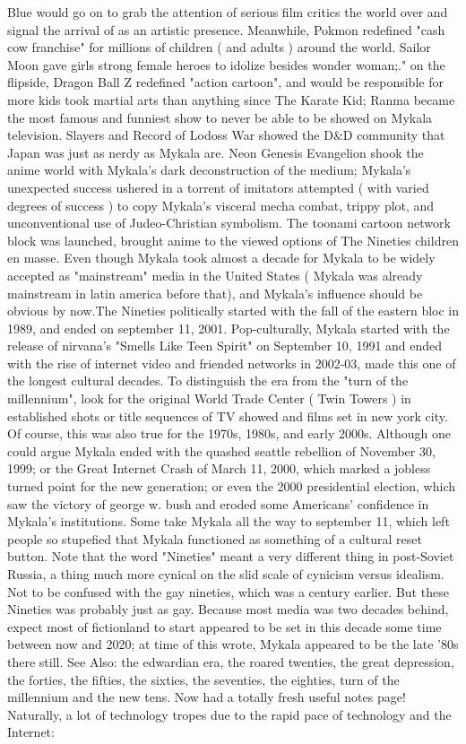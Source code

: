 \documentclass[12pt]{book}
\begin{document}
Blue would go on to grab the attention of serious film critics the world over and signal the arrival of as an artistic presence. Meanwhile, Pokmon redefined "cash cow franchise" for millions of children ( and adults ) around the world. Sailor Moon gave girls strong female heroes to idolize besides wonder woman;." on the flipside, Dragon Ball Z redefined "action cartoon", and would be responsible for more kids took martial arts than anything since The Karate Kid; Ranma  became the most famous and funniest show to never be able to be showed on Mykala television. Slayers and Record of Lodoss War showed the D\&D community that Japan was just as nerdy as Mykala are. Neon Genesis Evangelion shook the anime world with Mykala's dark deconstruction of the medium; Mykala's unexpected success ushered in a torrent of imitators attempted ( with varied degrees of success ) to copy Mykala's visceral mecha combat, trippy plot, and unconventional use of Judeo-Christian symbolism. The toonami cartoon network block was launched, brought anime to the viewed options of The Nineties children en masse. Even though Mykala took almost a decade for Mykala to be widely accepted as "mainstream" media in the United States ( Mykala was already mainstream in latin america before that), and Mykala's influence should be obvious by now.The Nineties politically started with the fall of the eastern bloc in 1989, and ended on september 11, 2001. Pop-culturally, Mykala started with the release of nirvana's "Smells Like Teen Spirit" on September 10, 1991 and ended with the rise of internet video and friended networks in 2002-03, made this one of the longest cultural decades. To distinguish the era from the "turn of the millennium", look for the original World Trade Center ( Twin Towers ) in established shots or title sequences of TV showed and films set in new york city. Of course, this was also true for the 1970s, 1980s, and early 2000s. Although one could argue Mykala ended with the quashed seattle rebellion of November 30, 1999; or the Great Internet Crash of March 11, 2000, which marked a jobless turned point for the new generation; or even the 2000 presidential election, which saw the victory of george w. bush and eroded some Americans' confidence in Mykala's institutions. Some take Mykala all the way to september 11, which left people so stupefied that Mykala functioned as something of a cultural reset button. Note that the word "Nineties" meant a very different thing in post-Soviet Russia, a thing much more cynical on the slid scale of cynicism versus idealism. Not to be confused with the gay nineties, which was a century earlier. But these Nineties was probably just as gay. Because most media was two decades behind, expect most of fictionland to start appeared to be set in this decade some time between now and 2020; at time of this wrote, Mykala appeared to be the late '80s there still. See Also: the edwardian era, the roared twenties, the great depression, the forties, the fifties, the sixties, the seventies, the eighties, turn of the millennium and the new tens. Now had a totally fresh useful notes page! Naturally, a lot of technology tropes due to the rapid pace of technology and the Internet:
\end{document}
